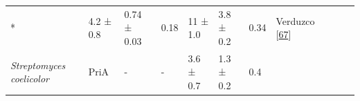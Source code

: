 \documentclass[12pt,twoside]{reedthesis}
\begin{document}
\begin{longtable}[]{@{}lllllllllll@{}}
\begin{minipage}[t]{0.04\columnwidth}
  *\strut
  \end{minipage} & \begin{minipage}[t]{0.06\columnwidth}\raggedright\strut
  4.2 ± 0.8\strut
  \end{minipage} & \begin{minipage}[t]{0.06\columnwidth}\raggedright\strut
  0.74 ± 0.03\strut
  \end{minipage} & \begin{minipage}[t]{0.06\columnwidth}\raggedright\strut
  0.18\strut
  \end{minipage} & \begin{minipage}[t]{0.05\columnwidth}\raggedright\strut
  11 ± 1.0\strut
  \end{minipage} & \begin{minipage}[t]{0.05\columnwidth}\raggedright\strut
  3.8 ± 0.2\strut
  \end{minipage} & \begin{minipage}[t]{0.03\columnwidth}\raggedright\strut
  0.34\strut
  \end{minipage} & \begin{minipage}[t]{0.11\columnwidth}\raggedright\strut
  Verduzco
  {[}\protect\hyperlink{ref-verduzco-castro_co-occurrence_2016}{67}{]}\strut
  \end{minipage}\tabularnewline
  \begin{minipage}[t]{0.15\columnwidth}\raggedright\strut
  \emph{Streptomyces coelicolor}\strut
  \end{minipage} & \begin{minipage}[t]{0.05\columnwidth}\raggedright\strut
  PriA\strut
  \end{minipage} & \begin{minipage}[t]{0.04\columnwidth}\raggedright\strut
  -\strut
  \end{minipage} & \begin{minipage}[t]{0.04\columnwidth}\raggedright\strut
  -\strut
  \end{minipage} & \begin{minipage}[t]{0.06\columnwidth}\raggedright\strut
  3.6 ± 0.7\strut
  \end{minipage} & \begin{minipage}[t]{0.06\columnwidth}\raggedright\strut
  1.3 ± 0.2\strut
  \end{minipage} & \begin{minipage}[t]{0.06\columnwidth}\raggedright\strut
  0.4\strut
  \end{minipage} & \begin{minipage}[t]{0.05\columnwidth}\raggedright\strut

\end{minipage}
\end{longtable}
\end{document}
